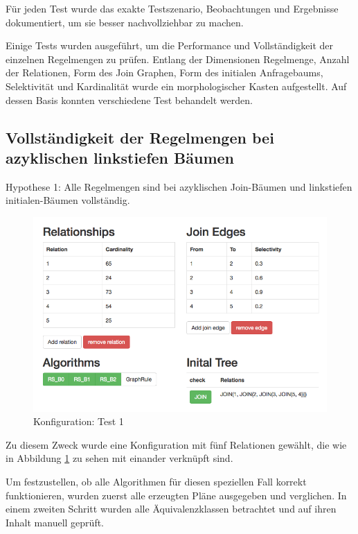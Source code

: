 Für jeden Test wurde das exakte Testszenario, Beobachtungen und Ergebnisse dokumentiert, um sie besser nachvollziehbar zu machen.









Einige Tests wurden ausgeführt, um die Performance und Vollständigkeit der einzelnen Regelmengen zu prüfen. Entlang der Dimensionen Regelmenge, Anzahl der Relationen, Form des Join Graphen, Form des initialen Anfragebaums, Selektivität und Kardinalität wurde ein morphologischer Kasten aufgestellt. Auf dessen Basis konnten verschiedene Test behandelt werden. 

\subsection{Vollständigkeit der Regelmengen bei azyklischen linkstiefen Bäumen }

Hypothese 1: Alle Regelmengen sind bei azyklischen Join-Bäumen und linkstiefen initialen-Bäumen vollständig.

\begin{figure}[ht]
  \centering
  \includegraphics[width=\textwidth]{05_ResultsEvaluation/00_media/Test1.png}
  \caption{Konfiguration: Test 1}
  \label{Konfiguration:Test1}
\end{figure}

Zu diesem Zweck wurde eine Konfiguration mit fünf Relationen gewählt, die wie in Abbildung \ref{Konfiguration:Test1} zu sehen mit einander verknüpft sind.

Um festzustellen, ob alle Algorithmen für diesen speziellen Fall korrekt funktionieren, wurden zuerst alle erzeugten Pläne ausgegeben und verglichen. In einem zweiten Schritt wurden alle Äquivalenzklassen betrachtet und auf ihren Inhalt manuell geprüft.




